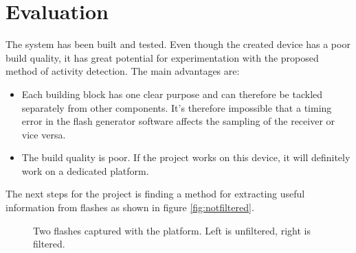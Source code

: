 \section{Evaluation}
The system has been built and tested. Even though the created device has a poor build quality, it has great potential for experimentation with the proposed method of activity detection. The main advantages are:
\begin{itemize}[itemsep=-1ex]
	\item Each building block has one clear purpose and can therefore be tackled separately from other components. It's therefore impossible that a timing error in the flash generator software affects the sampling of the receiver or vice versa.
	\item The build quality is poor. If the project works on this device, it will definitely work on a dedicated platform.
\end{itemize}
The next steps for the project is finding a method for extracting useful information from flashes as shown in figure \ref{fig:notfiltered}. 

\begin{figure}
	\centering     %
	\caption{Two flashes captured with the platform. Left is unfiltered, right is filtered.	\label{fig:FristFlashes}}
\end{figure}